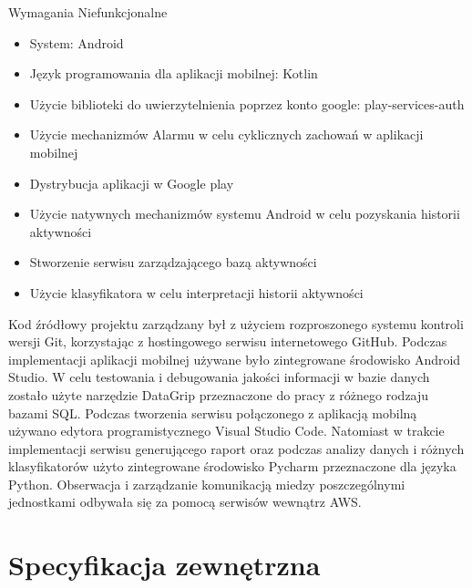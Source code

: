 \documentclass[a4paper,twoside,12pt]{book}
\begin{document}
Wymagania Niefunkcjonalne
\begin{itemize}
  \item System: Android
  \item Język programowania dla aplikacji mobilnej: Kotlin
  \item Użycie biblioteki do uwierzytelnienia poprzez konto google: play-services-auth
  \item Użycie mechanizmów Alarmu w celu cyklicznych zachowań w aplikacji mobilnej
  \item Dystrybucja aplikacji w Google play\cite{publish_app}
  \item Użycie natywnych mechanizmów systemu Android w celu pozyskania historii aktywności
  \item Stworzenie serwisu zarządzającego bazą aktywności
  \item Użycie klasyfikatora w celu interpretacji historii aktywności
\end{itemize}

Kod źródłowy projektu zarządzany był z użyciem rozproszonego systemu kontroli wersji Git, korzystając z hostingowego serwisu internetowego GitHub. Podczas implementacji aplikacji mobilnej używane było zintegrowane środowisko Android Studio. W celu testowania i debugowania jakości informacji w bazie danych zostało użyte narzędzie DataGrip przeznaczone do pracy z różnego rodzaju bazami SQL. Podczas tworzenia serwisu połączonego z aplikacją mobilną używano edytora programistycznego Visual Studio Code. Natomiast w trakcie implementacji serwisu generującego raport oraz podczas analizy danych i różnych klasyfikatorów użyto zintegrowane środowisko Pycharm przeznaczone dla języka Python. Obserwacja i zarządzanie komunikacją miedzy poszczególnymi jednostkami odbywała się za pomocą serwisów wewnątrz AWS.


\chapter{Specyfikacja zewnętrzna}
\end{document}

